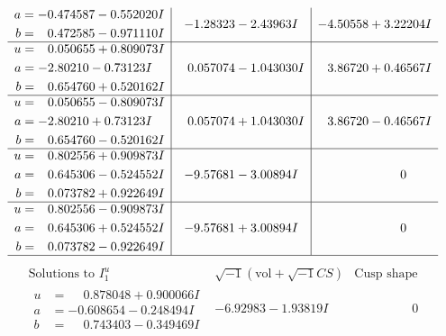 \documentclass[1p]{elsarticle_modified}
\theoremstyle{definition}
\newcommand{\I}{\sqrt{-1}}
\begin{document}
$$\begin{array}{c|c|c}
\begin{aligned}
a &= -0.474587 - 0.552020 I \\
b &= \phantom{-}0.472585 - 0.971110 I\end{aligned}
 & -1.28323 - 2.43963 I & -4.50558 + 3.22204 I \\ \hline\begin{aligned}
u &= \phantom{-}0.050655 + 0.809073 I \\
a &= -2.80210 - 0.73123 I \\
b &= \phantom{-}0.654760 + 0.520162 I\end{aligned}
 & \phantom{-}0.057074 - 1.043030 I & \phantom{-}3.86720 + 0.46567 I \\ \hline\begin{aligned}
u &= \phantom{-}0.050655 - 0.809073 I \\
a &= -2.80210 + 0.73123 I \\
b &= \phantom{-}0.654760 - 0.520162 I\end{aligned}
 & \phantom{-}0.057074 + 1.043030 I & \phantom{-}3.86720 - 0.46567 I \\ \hline\begin{aligned}
u &= \phantom{-}0.802556 + 0.909873 I \\
a &= \phantom{-}0.645306 - 0.524552 I \\
b &= \phantom{-}0.073782 + 0.922649 I\end{aligned}
 & -9.57681 - 3.00894 I & \phantom{-0.000000 } 0 \\ \hline\begin{aligned}
u &= \phantom{-}0.802556 - 0.909873 I \\
a &= \phantom{-}0.645306 + 0.524552 I \\
b &= \phantom{-}0.073782 - 0.922649 I\end{aligned}
 & -9.57681 + 3.00894 I & \phantom{-0.000000 } 0\\
 \hline 
 \end{array}$$\newpage$$\begin{array}{c|c|c}  
\text{Solutions to }I^u_{1}& \I (\text{vol} + \sqrt{-1}CS) & \text{Cusp shape}\\
 \hline 
\begin{aligned}
u &= \phantom{-}0.878048 + 0.900066 I \\
a &= -0.608654 - 0.248494 I \\
b &= \phantom{-}0.743403 - 0.349469 I\end{aligned}
 & -6.92983 - 1.93819 I & \phantom{-0.000000 } 0 \\ \hline\begin{aligned}

\end{aligned}
\end{array}$$
\end{document}
